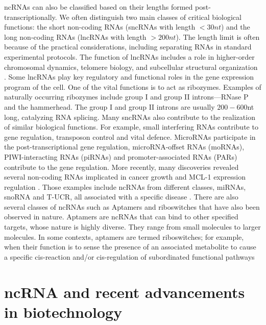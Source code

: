 ncRNAs can also be classified based on their lengths formed post-transcriptionally. We often distinguish two main classes of critical biological functions: the short non-coding RNAs (sncRNAs with length $<30nt$) and the long non-coding RNAs (lncRNAs with length $>200nt$). The length limit is often because of the practical considerations, including separating RNAs in standard experimental protocols. The function of lncRNAs includes a role in higher-order chromosomal dynamics, telomere biology, and subcellular structural organization \cite{bergmann2014long,cusanelli2014telomeric}. Some lncRNAs play key regulatory and functional roles in the gene expression program of the cell. One of the vital functions is to act as ribozymes. Examples of naturally occurring ribozymes include group I and group II introns---RNase P and the hammerhead. The group I and group II introns are usually $200-600$nt long, catalyzing RNA splicing. Many sncRNAs also contribute to the realization of similar biological functions. For example, small interfering RNAs contribute to gene regulation, transposon control and vital defence. MicroRNAs participate in the post-transcriptional gene regulation, microRNA-offset RNAs (moRNAs), PIWI-interacting RNAs (piRNAs) and promoter-associated RNAs (PARs) contribute to the gene regulation. More recently,  many discoveries revealed several non-coding RNAs implicated in cancer growth and MCL-1 expression regulation \cite{wang2021circpvt1, santosh2015non}. Those examples include ncRNAs from different classes, miRNAs, snoRNA and T-UCR, all associated with a specific disease \cite{santosh2015non,esteller2011non}. There are also several classes of ncRNAs such as Aptamers and riboswitches that have also been observed in nature. Aptamers are ncRNAs that can bind to other specified targets, whose nature is highly diverse. They range from small molecules to larger molecules. In some contexts, aptamers are termed riboswitches; for example, when their function is to sense the presence of an associated metabolite to cause a specific cis-reaction and/or cis-regulation of subordinated functional pathways \cite{winkler2003genetic}

\section{ncRNA and recent advancements in biotechnology}

